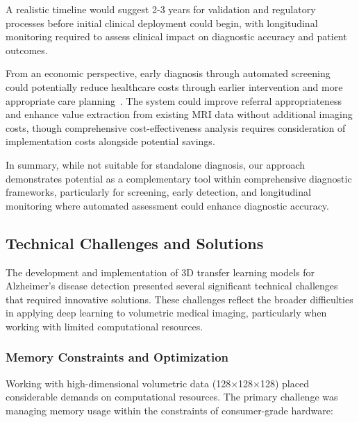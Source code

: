\documentclass[12pt, a4paper]{article}
\begin{document}
A realistic timeline would suggest 2-3 years for validation and regulatory processes before initial clinical deployment could begin, with longitudinal monitoring required to assess clinical impact on diagnostic accuracy and patient outcomes.

From an economic perspective, early diagnosis through automated screening could potentially reduce healthcare costs through earlier intervention and more appropriate care planning~\cite{jack2018nia}. The system could improve referral appropriateness and enhance value extraction from existing MRI data without additional imaging costs, though comprehensive cost-effectiveness analysis requires consideration of implementation costs alongside potential savings.

In summary, while not suitable for standalone diagnosis, our approach demonstrates potential as a complementary tool within comprehensive diagnostic frameworks, particularly for screening, early detection, and longitudinal monitoring where automated assessment could enhance diagnostic accuracy.

\subsection{Technical Challenges and Solutions}

The development and implementation of 3D transfer learning models for Alzheimer's disease detection presented several significant technical challenges that required innovative solutions. These challenges reflect the broader difficulties in applying deep learning to volumetric medical imaging, particularly when working with limited computational resources.

\subsubsection{Memory Constraints and Optimization}

Working with high-dimensional volumetric data (128×128×128) placed considerable demands on computational resources. The primary challenge was managing memory usage within the constraints of consumer-grade hardware:
\end{document}
